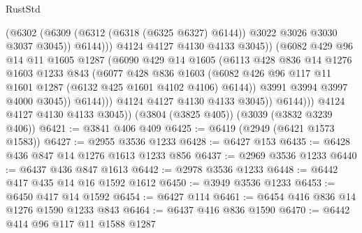 \begin{lexlean}{RustStd}
\begin{coremodule}
                                (@6302
                                  (@6309
                                    (@6312 (@6318 (@6325 @6327) @6144))
                                    @3022
                                    @3026
                                    @3030
                                    @3037
                                    @3045))
                                @6144)))
                          @4124
                          @4127
                          @4130
                          @4133
                          @3045))
                      (@6082
                        @429
                        @96
                        @14
                        @11
                        @1605
                        @1287
                        (@6090
                          @429
                          @14
                          @1605
                          (@6113
                            @428
                            @836
                            @14
                            @1276
                            @1603
                            @1233
                            @843
                            (@6077
                              @428
                              @836
                              @1603
                              (@6082
                                @426
                                @96
                                @117
                                @11
                                @1601
                                @1287
                                (@6132 @425 @1601 @4102 @4106)
                                @6144))
                            @3991
                            @3994
                            @3997
                            @4000
                            @3045))
                        @6144)))
                  @4124
                  @4127
                  @4130
                  @4133
                  @3045))
              @6144)))
        @4124
        @4127
        @4130
        @4133
        @3045))
    (@3804 (@3825 @405))
    (@3039 (@3832 @3239 @406))
@6421 := @3841 @406 @409
@6425 := @6419 (@2949 (@6421 @1573 @1583))
@6427 := @2955 @3536 @1233
@6428 := @6427 @153
@6435 := @6428 @436 @847 @14 @1276 @1613 @1233 @856
@6437 := @2969 @3536 @1233
@6440 := @6437 @436 @847 @1613
@6442 := @2978 @3536 @1233
@6448 := @6442 @417 @435 @14 @16 @1592 @1612
@6450 := @3949 @3536 @1233
@6453 := @6450 @417 @14 @1592
@6454 := @6427 @114
@6461 := @6454 @416 @836 @14 @1276 @1590 @1233 @843
@6464 := @6437 @416 @836 @1590
@6470 := @6442 @414 @96 @117 @11 @1588 @1287

\end{coremodule}
\end{lexlean}
